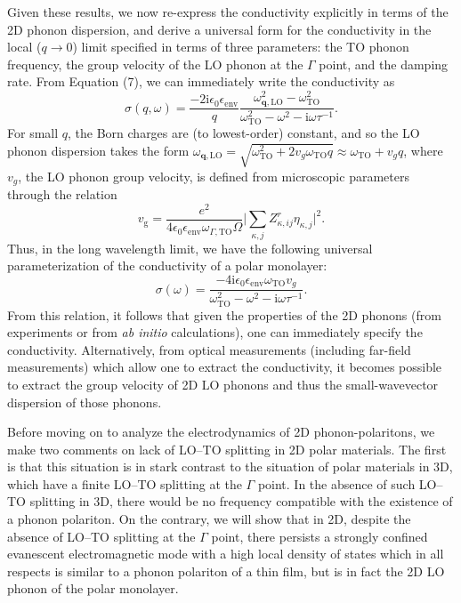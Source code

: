 \documentclass[aps,prb,twocolumn,
	           groupedaddress,superscriptaddress,
               amsfonts,amssymb,amsmath,floatfix,
	           citeautoscript]{revtex4-1}
\newcommand{\iu}{\mathrm{i}}
\begin{document}
Given these results, we now re-express the conductivity explicitly in terms of the 2D phonon dispersion, and derive a universal form for the conductivity in the local ($q\rightarrow 0$) limit specified in terms of three parameters: the TO phonon frequency, the group velocity of the LO phonon at the $\Gamma$ point, and the damping rate. From Equation (7), we can immediately write the conductivity as
  \begin{equation}
  \sigma(q,\omega) = \frac{-2\iu\epsilon_0\epsilon_{\mathrm{env}}}{q}\frac{\omega^2_{\mathbf{q},\mathrm{LO}}-\omega^2_{\mathrm{TO}}}{\omega^2_{\mathrm{TO}}-\omega^2-\iu\omega\tau^{-1}}.
  \end{equation}
 For small $q$,  the Born charges are (to lowest-order) constant, and so the LO phonon dispersion takes the form $\omega_{\mathbf{q},\mathrm{LO}}=\sqrt{\omega^2_{\mathrm{TO}}+2v_g\omega_{\mathrm{TO}}q} \approx \omega_{\mathrm{TO}} + v_gq$, where $v_g$, the LO phonon group velocity, is defined from microscopic parameters through the relation
 \begin{equation}
    v_{\mathrm{g}} = \frac{e^2 }{4\epsilon_0 \epsilon_{\mathrm{env}}\omega_{\Gamma, \mathrm{TO}}\Omega}\Big|\sum\limits_{\kappa,j}Z^r_{\kappa,ij}\eta_{\kappa,j}  \Big|^2. 
\end{equation}
Thus, in the long wavelength limit, we have the following universal parameterization of the conductivity of a polar monolayer:
\begin{equation}
    \sigma(\omega) =  \frac{-4\iu\epsilon_0\epsilon_{\mathrm{env}}\omega_{\mathrm{TO}}v_g}{\omega^2_{\mathrm{TO}}-\omega^2-\iu\omega\tau^{-1}}.
    \label{eq:localsigma}
\end{equation}
From this relation, it follows that given the properties of the 2D phonons (from experiments or from \emph{ab initio} calculations), one can immediately specify the conductivity. Alternatively, from optical measurements (including far-field measurements) which allow one to extract the conductivity, it becomes possible to extract the group velocity of 2D LO phonons and thus the small-wavevector dispersion of those phonons. 
  
Before moving on to analyze the electrodynamics of 2D phonon-polaritons, we make two comments on lack of LO--TO splitting in 2D polar materials. The first is that this situation is in stark contrast to the situation of polar materials in 3D, which have a finite LO--TO splitting at the $\Gamma$ point. In the absence of such LO--TO splitting in 3D, there would be no frequency compatible with the existence of a phonon  polariton. On the contrary, we will show that in 2D, despite the absence of LO--TO splitting at the $\Gamma$ point, there persists a strongly confined evanescent electromagnetic mode with a high local density of states which in all respects is similar to a phonon polariton of a thin film, but is in fact the 2D LO phonon of the polar monolayer.
\end{document}
